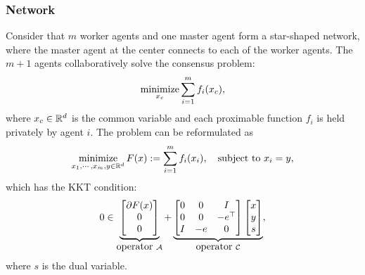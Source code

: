 \subsubsection{Network}\label{sec:network}
Consider that $m$ worker agents and one master agent form a star-shaped network, where the master agent at the center connects to each of the worker agents. The $m+1$ agents collaboratively solve the consensus problem:  $$\operatorname*{minimize}_{x_c} \sum_{i=1}^m f_i(x_c),$$ where $x_c\in \mathbb{R}^d$ is the common variable and each proximable function $f_i$ is held privately by agent $i$. The problem can be reformulated as 
\begin{align}
\Min_{x_1,\cdots,x_m,y\in \RR^d} F(x) := \sum_{i=1}^mf_i(x_i),\quad \St~ x_i=y,   
\end{align}
{which has the  KKT condition}:
\begin{equation}\label{pro:decentral}
0\in\underbrace{
\begin{bmatrix}
\partial F(x)\\
0 \\
0
\end{bmatrix}}_{\mbox{operator}~\cA}+\underbrace{\begin{bmatrix}
0 & 0&I\\
0 & 0 & -e^\top \\
I & -e & 0
\end{bmatrix}\begin{bmatrix}
x\\
y\\
s
\end{bmatrix}}_{\mbox{operator}~\cC},
\end{equation}
where $s$ is the dual variable.


